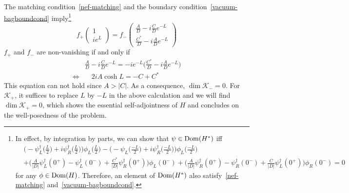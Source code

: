 The matching condition~\cref{nef-matching} and the boundary condition~\cref{vacuum-bagboundcond} imply\footnote{
In effect, by integration by parts, we can show that $\psi\in\mathrm{Dom}(H^*)$ iff 
\begin{equation*}\begin{split}
&\Big(-\psi^\dagger_L\big(\frac L 2 \big) + i\psi_R^\dagger\big(\frac L 2\big) \Big)\phi_L\big(\frac L 2\big)
-\Big(-\psi_L\big(\frac{-L}{ 2} \big) + i\psi_R^\dagger\big(\frac{ -L}{ 2}\big) \Big)\phi_L\big(\frac{ -L}{ 2}\big) \\
&+\Big(\frac{A}{|D|} \psi_L^\dagger(0^+) - \psi_L^\dagger(0^-) + \frac{C^*}{|D|}\psi_R^\dagger(0^+)\Big)\phi_L(0^-) 
+ \Big(\frac{A}{|D|} \psi_R^\dagger(0^+) - \psi_R^\dagger(0^-) + \frac{C}{|D|}\psi_L^\dagger(0^+)\Big)\phi_R(0^-) =0
\end{split}
\end{equation*}
for any $\phi\in\mathrm{Dom}(H)$.
Therefore, an element of $\mathrm{Dom}(H^*)$ also satisfy~\cref{nef-matching} and~\cref{vacuum-bagboundcond}.
}
\begin{equation}
f_+ \begin{pmatrix} 1 \\ ie^L \end{pmatrix}
= f_- \begin{pmatrix} \frac{A}{D} - i\frac{C}{D} e^{-L}  \\
\frac{C^*}{D} - i \frac{A}{D} e^{-L} \end{pmatrix}
\end{equation}
$f_+$ and $f_-$ are non-vanishing if and only if 
\begin{equation}
\begin{split}
& \frac A D - i\frac C D e^{-L} =  -ie^{-L}\big(\frac{ C^*}{ D} -i \frac A D e^{-L}\big) \\
\Leftrightarrow & \quad 2i A \cosh L = -C + C^*
\end{split}
\end{equation}
This equation can not hold since $A > |C|$.
As a consequence, $\dim\mathcal{K}_- = 0$. 
For $\mathcal{K}_+$, it suffices to replace $L$ by $-L$ in the above calculation and we will find $\dim\mathcal{K}_+ = 0$, which shows the essential self-adjointness of $H$ and concludes on the well-posedness of the problem.

















